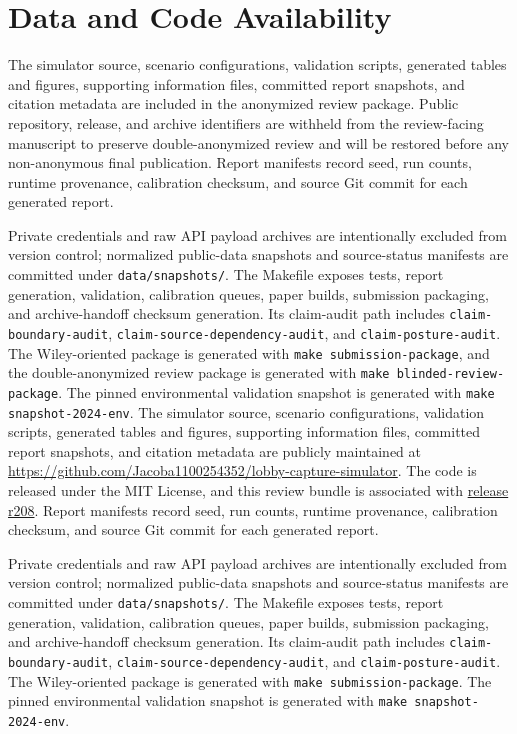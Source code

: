 \providecommand{\submissionsection}[1]{\section*{#1}}

\submissionsection{Data and Code Availability}

\begin{sloppypar}
\ifdefined\blindreview
The simulator source, scenario configurations, validation scripts, generated tables and figures, supporting information files, committed report snapshots, and citation metadata are included in the anonymized review package. Public repository, release, and archive identifiers are withheld from the review-facing manuscript to preserve double-anonymized review and will be restored before any non-anonymous final publication. Report manifests record seed, run counts, runtime provenance, calibration checksum, and source Git commit for each generated report.

Private credentials and raw API payload archives are intentionally excluded from version control; normalized public-data snapshots and source-status manifests are committed under \texttt{data/snapshots/}. The Makefile exposes tests, report generation, validation, calibration queues, paper builds, submission packaging, and archive-handoff checksum generation. Its claim-audit path includes \texttt{claim-boundary-audit}, \texttt{claim-source-dependency-audit}, and \texttt{claim-posture-audit}. The Wiley-oriented package is generated with \texttt{make submission-package}, and the double-anonymized review package is generated with \texttt{make blinded-review-package}. The pinned environmental validation snapshot is generated with \texttt{make snapshot-2024-env}.
\else
The simulator source, scenario configurations, validation scripts, generated tables and figures, supporting information files, committed report snapshots, and citation metadata are publicly maintained at \url{https://github.com/Jacoba1100254352/lobby-capture-simulator}. The code is released under the MIT License, and this review bundle is associated with \href{https://github.com/Jacoba1100254352/lobby-capture-simulator/releases/tag/paper-publication-readiness-2026-06-19-r208}{release r208}. Report manifests record seed, run counts, runtime provenance, calibration checksum, and source Git commit for each generated report.

Private credentials and raw API payload archives are intentionally excluded from version control; normalized public-data snapshots and source-status manifests are committed under \texttt{data/snapshots/}. The Makefile exposes tests, report generation, validation, calibration queues, paper builds, submission packaging, and archive-handoff checksum generation. Its claim-audit path includes \texttt{claim-boundary-audit}, \texttt{claim-source-dependency-audit}, and \texttt{claim-posture-audit}. The Wiley-oriented package is generated with \texttt{make submission-package}. The pinned environmental validation snapshot is generated with \texttt{make snapshot-2024-env}.
\fi
\end{sloppypar}

